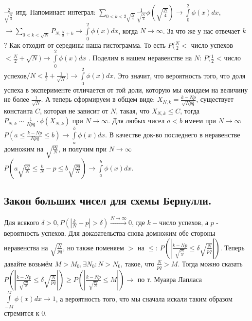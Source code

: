 $\frac{2}{\sqrt{\frac{N}{4}}}$ итд. Напоминает интеграл: $\sum\limits_{0 < k < 2\sqrt{\frac{N}{4}}} \frac{1}{\sqrt{\frac{N}{4}}} \phi(\sqrt{\frac{N}{4}}) \to \int\limits_{0}^{2} \phi(x) dx$, $\xrightarrow{} \sum\limits_{0 < k < \sqrt{N}} P_{N, \frac{N}{2} + k} \to \int\limits_{0}^{2} \phi(x) dx$, когда $N \to \infty$. За что же у нас отвечает $k$? Как отходит от середины наша гистограмма. То есть $P(\frac{N}{2} < $ число успехов $< \frac{N}{2} + \sqrt{N}) \to \int\limits_{0}^{2} \phi(x) dx$ . Поделим в нашем неравенстве на $N$: $P(\frac{1}{2}$ < число успехов$/N < \frac{1}{2} + \frac{1}{\sqrt{N}}) \to \int\limits_{0}^{2} \phi(x) dx$. Это значит, что вероятность того, что доля успеха в эксперименте отличается от той доли, которую мы ожидаем на величину не более $\frac{1}{\sqrt{N}}$. А теперь сформируем в общем виде: $X_{N,k} = \frac{k - Np}{\sqrt{Npq}}$, существует константа $C$, которая не зависит от $N$, такая, что $X_{N,k} \leq C$, тогда $P_{N,k} \sim \frac{1}{Npq} \cdot \phi(X_{N,k})$ при $N \to \infty$. Для любых чисел $a < b$ имеем при $N \to \infty$ $P(a \leq \frac{k - Np}{Npq} \leq b) \to \int\limits_{a}^{b} \phi(x) dx$. В качестве док-во последнего в неравенстве домножим на $\sqrt{\frac{pq}{N}}$, и получим при $N \to \infty$ $P(a\sqrt{\frac{pq}{N}} \leq \frac{k}{N} - p \leq b\sqrt{\frac{pq}{N}}) \to \int\limits_{a}^{b} \phi(x) dx$.

\subsection{Закон больших чисел для схемы Бернулли.}
Для всякого $\delta > 0, P(|\frac{k}{N} - p| > \delta) \xrightarrow{N \to \infty} 0$, где $k-$число успехов, а $p$ - вероятность успехов. Для доказательства снова домножим обе стороны неравенства на $\sqrt{\frac{N}{pq}}$, но также поменяем $>$ на $\leq$: $P(|\frac{k - Np}{\sqrt{\frac{pq}{N}}} \leq \delta \sqrt{\frac{N}{pq}}|)$. Теперь давайте возьмём $M > M_0, \exists N_0:N>N_0$, такое, что $\frac{N}{pq} > M$. Тогда можно сказать  $P(|\frac{k - Np}{\sqrt{\frac{pq}{N}}} \leq \delta \sqrt{\frac{N}{pq}}|) \geq P(|\frac{k - Np}{\sqrt{\frac{pq}{N}}} \leq M|) \to$ по т. Муавра Лапласа $\int\limits_{-M}^{M}\phi(x) dx \to 1$, а вероятность того, что мы сначала искали таким образом стремится к 0.
